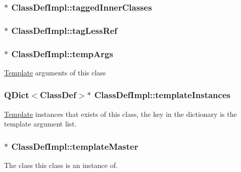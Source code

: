 \subsubsection[{tagged\+Inner\+Classes}]{$\ast$ Class\+Def\+Impl\+::tagged\+Inner\+Classes}\label{class_class_def_impl_a8753bef2143ebdef9451738751087e5f}
\hypertarget{class_class_def_impl_a57431554d3d5190b38d8ce18b65f9b09}{}
\subsubsection[{tag\+Less\+Ref}]{$\ast$ Class\+Def\+Impl\+::tag\+Less\+Ref}\label{class_class_def_impl_a57431554d3d5190b38d8ce18b65f9b09}
\hypertarget{class_class_def_impl_aacfd7b41980ab90e43e015ca2583a56c}{}
\subsubsection[{temp\+Args}]{$\ast$ Class\+Def\+Impl\+::temp\+Args}\label{class_class_def_impl_aacfd7b41980ab90e43e015ca2583a56c}
\hyperlink{class_template}{Template} arguments of this class \hypertarget{class_class_def_impl_a40568b5135505092ae7acae3e4ce224f}{}
\subsubsection[{template\+Instances}]{\setlength{\rightskip}{0pt plus 5cm}Q\+Dict$<${\bf Class\+Def}$>$$\ast$ Class\+Def\+Impl\+::template\+Instances}\label{class_class_def_impl_a40568b5135505092ae7acae3e4ce224f}
\hyperlink{class_template}{Template} instances that exists of this class, the key in the dictionary is the template argument list. \hypertarget{class_class_def_impl_a14389d44bce551c00b53391115004d5f}{}
\subsubsection[{template\+Master}]{$\ast$ Class\+Def\+Impl\+::template\+Master}\label{class_class_def_impl_a14389d44bce551c00b53391115004d5f}
The class this class is an instance of. \hypertarget{class_class_def_impl_af694528f58bf5c3f872e14c364dd7f89}{}
